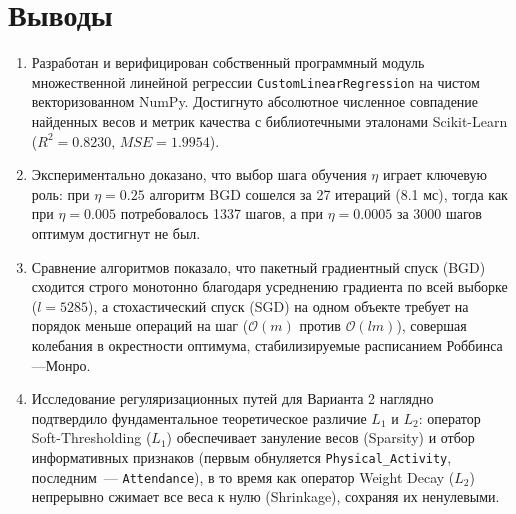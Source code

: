\documentclass[14pt,a4paper]{extarticle}
\begin{document}
\section{Выводы}
\begin{enumerate}
    \item Разработан и верифицирован собственный программный модуль множественной линейной регрессии \texttt{CustomLinearRegression} на чистом векторизованном NumPy. Достигнуто абсолютное численное совпадение найденных весов и метрик качества с библиотечными эталонами Scikit-Learn ($R^2 = 0.8230$, $MSE = 1.9954$).
    \item Экспериментально доказано, что выбор шага обучения $\eta$ играет ключевую роль: при $\eta = 0.25$ алгоритм BGD сошелся за 27 итераций (8.1 мс), тогда как при $\eta = 0.005$ потребовалось 1337 шагов, а при $\eta = 0.0005$ за 3000 шагов оптимум достигнут не был.
    \item Сравнение алгоритмов показало, что пакетный градиентный спуск (BGD) сходится строго монотонно благодаря усреднению градиента по всей выборке ($l = 5285$), а стохастический спуск (SGD) на одном объекте требует на порядок меньше операций на шаг ($\mathcal{O}(m)$ против $\mathcal{O}(lm)$), совершая колебания в окрестности оптимума, стабилизируемые расписанием Роббинса---Монро.
    \item Исследование регуляризационных путей для Варианта 2 наглядно подтвердило фундаментальное теоретическое различие $L_1$ и $L_2$: оператор Soft-Thresholding ($L_1$) обеспечивает зануление весов (Sparsity) и отбор информативных признаков (первым обнуляется \texttt{Physical\_Activity}, последним~--- \texttt{Attendance}), в то время как оператор Weight Decay ($L_2$) непрерывно сжимает все веса к нулю (Shrinkage), сохраняя их ненулевыми.
\end{enumerate}
\end{document}
